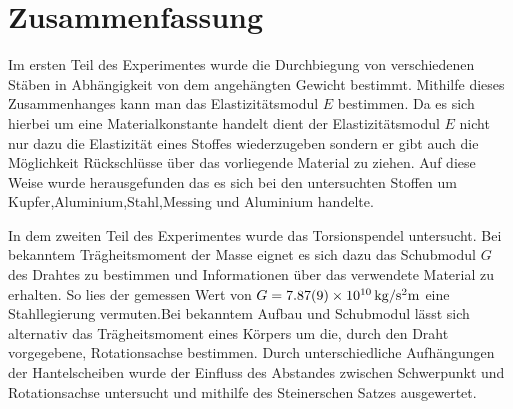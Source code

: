 
\section{Zusammenfassung}
Im ersten Teil des Experimentes wurde die Durchbiegung von verschiedenen Stäben in Abhängigkeit von dem angehängten Gewicht bestimmt. Mithilfe dieses Zusammenhanges kann man das Elastizitätsmodul $E$ bestimmen. Da es sich hierbei um eine Materialkonstante handelt dient der Elastizitätsmodul $E$ nicht nur dazu die Elastizität eines Stoffes wiederzugeben sondern er gibt auch die Möglichkeit Rückschlüsse über das vorliegende Material zu ziehen.
Auf diese Weise wurde herausgefunden das es sich bei den untersuchten Stoffen um Kupfer,Aluminium,Stahl,Messing und Aluminium handelte.

In dem zweiten Teil des Experimentes wurde das Torsionspendel untersucht. Bei bekanntem Trägheitsmoment der Masse eignet es sich dazu das Schubmodul $G$ des Drahtes zu bestimmen und Informationen über das verwendete Material zu erhalten. So lies der gemessen Wert von $G=\SI{7.87+-0.09e10}{kg \per \second \squared  \metre}$ eine Stahllegierung vermuten.Bei bekanntem Aufbau und Schubmodul lässt sich alternativ das Trägheitsmoment eines Körpers um die, durch den Draht vorgegebene, Rotationsachse bestimmen. Durch unterschiedliche Aufhängungen der Hantelscheiben wurde der Einfluss des Abstandes zwischen Schwerpunkt und Rotationsachse untersucht und mithilfe des Steinerschen Satzes ausgewertet.